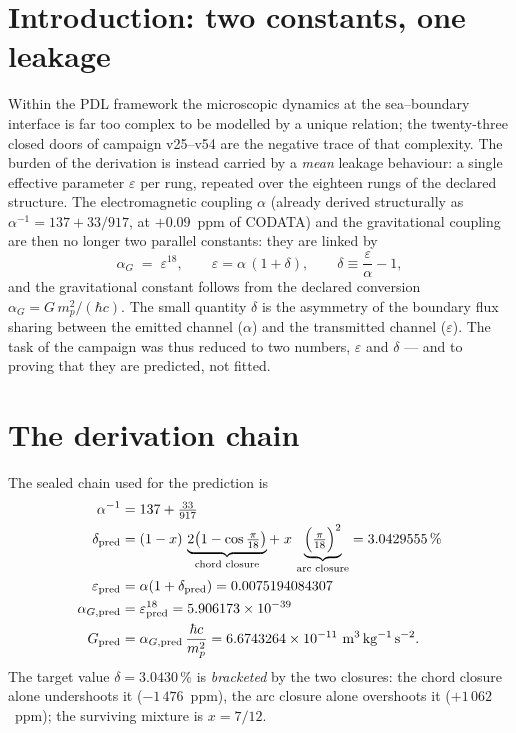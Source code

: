 \documentclass[11pt,a4paper]{article}
\begin{document}
\section{Introduction: two constants, one leakage}
Within the PDL framework the microscopic dynamics at the sea--boundary interface is far too complex to be modelled by a unique relation; the twenty-three closed doors of campaign v25--v54 are the negative trace of that complexity. The burden of the derivation is instead carried by a \emph{mean} leakage behaviour: a single effective parameter $\varepsilon$ per rung, repeated over the eighteen rungs of the declared structure. The electromagnetic coupling $\alpha$ (already derived structurally as $\alpha^{-1} = 137 + 33/917$, at $+0.09$~ppm of CODATA) and the gravitational coupling are then no longer two parallel constants: they are linked by
\begin{equation}
\alpha_G \;=\; \varepsilon^{18}, \qquad \varepsilon = \alpha\,(1+\delta), \qquad \delta \equiv \frac{\varepsilon}{\alpha} - 1,
\end{equation}
and the gravitational constant follows from the declared conversion $\alpha_G = G\,m_p^2/(\hbar c)$. The small quantity $\delta$ is the asymmetry of the boundary flux sharing between the emitted channel ($\alpha$) and the transmitted channel ($\varepsilon$). The task of the campaign was thus reduced to two numbers, $\varepsilon$ and $\delta$ --- and to proving that they are predicted, not fitted.

\section{The derivation chain}
The sealed chain used for the prediction is
\begin{align}
\alpha^{-1} &= 137 + \tfrac{33}{917} \\
\delta_{\mathrm{pred}} &= (1-x)\,\underbrace{2\bigl(1-\cos\tfrac{\pi}{18}\bigr)}_{\text{chord closure}} + \; x\,\underbrace{\Bigl(\tfrac{\pi}{18}\Bigr)^2}_{\text{arc closure}} = 3.0429555\,\% \\
\varepsilon_{\mathrm{pred}} &= \alpha(1+\delta_{\mathrm{pred}}) = 0.0075194084307 \\
\alpha_{G,\mathrm{pred}} &= \varepsilon_{\mathrm{pred}}^{18} = 5.906173\times10^{-39} \\
G_{\mathrm{pred}} &= \alpha_{G,\mathrm{pred}}\,\frac{\hbar c}{m_p^2} = 6.6743264\times10^{-11}\ \mathrm{m^3\,kg^{-1}\,s^{-2}} .
\end{align}
The target value $\delta = 3.0430\,\%$ is \emph{bracketed} by the two closures: the chord closure alone undershoots it ($-1\,476$~ppm), the arc closure alone overshoots it ($+1\,062$~ppm); the surviving mixture is $x = 7/12$.
\end{document}
